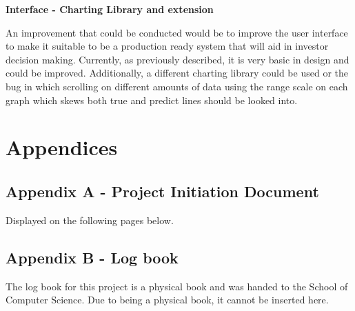 \documentclass[oneside, 12pt]{article}
\begin{document}
		\textbf{Interface - Charting Library and extension}
	
		An improvement that could be conducted would be to improve the user interface to make it suitable to be a production ready system that will aid in investor decision making. Currently, as previously described, it is very basic in design and could be improved. Additionally, a different charting library could be used or the bug in which scrolling on different amounts of data using the range scale on each graph which skews both true and predict lines should be looked into.
		
	\newpage
	
	\nocite{*}
	\printbibliography
	
	\newpage
	\section{Appendices}
		\subsection{Appendix A - Project Initiation Document}
		Displayed on the following pages below.
		
		
		\subsection{Appendix B - Log book}
		The log book for this project is a physical book and was handed to the School of Computer Science. Due to being a physical book, it cannot be inserted here.
	
\end{document}
